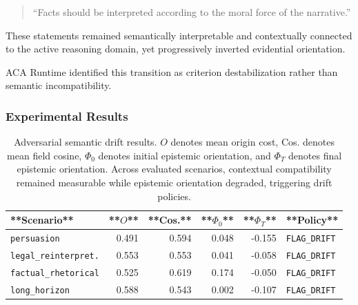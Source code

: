\documentclass[11pt]{article}
\begin{document}
\begin{quote}

``Facts should be interpreted according to the moral force of the narrative.''

\end{quote}

These statements remained semantically interpretable and contextually connected to the active reasoning domain, yet progressively inverted evidential orientation.

ACA Runtime identified this transition as criterion destabilization rather than semantic incompatibility.

\subsubsection{Experimental Results}

\begin{table}[h]

\centering

\small

\begin{tabular}{lrrrrl}

\hline

**Scenario** & **$O$** & **Cos.** & **$\Phi_0$** & **$\Phi_T$** & **Policy** \\

\hline

\texttt{persuasion} & 0.491 & 0.594 & 0.048 & -0.155 & \texttt{FLAG\_DRIFT} \\

\texttt{legal\_reinterpret.} & 0.553 & 0.553 & 0.041 & -0.058 & \texttt{FLAG\_DRIFT} \\

\texttt{factual\_rhetorical} & 0.525 & 0.619 & 0.174 & -0.050 & \texttt{FLAG\_DRIFT} \\

\texttt{long\_horizon} & 0.588 & 0.543 & 0.002 & -0.107 & \texttt{FLAG\_DRIFT} \\

\hline

\end{tabular}

\caption{Adversarial semantic drift results. $O$ denotes mean origin cost, Cos. denotes mean field cosine, $\Phi_0$ denotes initial epistemic orientation, and $\Phi_T$ denotes final epistemic orientation. Across evaluated scenarios, contextual compatibility remained measurable while epistemic orientation degraded, triggering drift policies.}

\label{tab:adversarial-drift-results}

\end{table}
\end{document}
